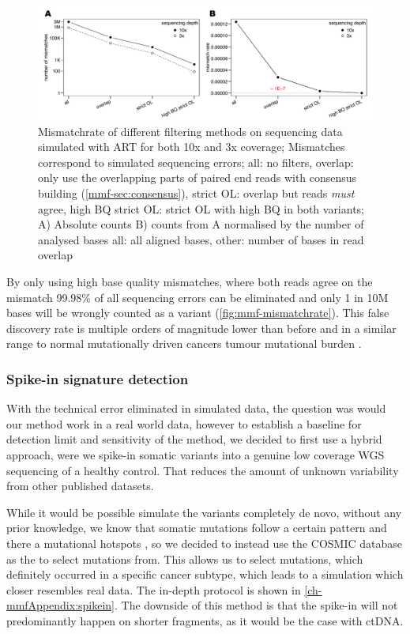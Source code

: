 \begin{figure}[!ht]
\centering
\includegraphics[width=.99\linewidth]{Figures/MisMatchFinder/mismatchrateCleanSequencing.pdf}
\caption[Mismatchrate of different filtering methods]{Mismatchrate of different filtering methods on sequencing data simulated with ART\cite{Huang2011} for both 10x and 3x coverage; Mismatches correspond to simulated sequencing errors; all: no filters, overlap: only use the overlapping parts of paired end reads with consensus building (\protect\autoref{mmf-sec:consensus}), strict OL: overlap but reads \emph{must} agree, high BQ strict OL: strict OL with high BQ in both variants; A) Absolute counts B) counts from A normalised by the number of analysed bases all: all aligned bases, other: number of bases in read overlap}\label{fig:mmf-mismatchrate}
\end{figure}

By only using high base quality mismatches, where both reads agree on the mismatch 99.98\% of all sequencing errors can be eliminated and only 1 in 10M bases will be wrongly counted as a variant (\autoref{fig:mmf-mismatchrate}). This false discovery rate is multiple orders of magnitude lower than before and in a similar range to normal mutationally driven cancers tumour mutational burden \cite{Alexandrov2020,Lawrence2013a}.


\subsubsection{Spike-in signature detection}
\label{mmf-sec:simSingnatures}
With the technical error eliminated in simulated data, the question was would our method work in a real world data, however to establish a baseline for detection limit and sensitivity of the method, we decided to first use a hybrid approach, were we spike-in somatic variants into a genuine low coverage WGS sequencing of a healthy control. That reduces the amount of unknown variability from other published datasets.

While it would be possible simulate the variants completely de novo, without any prior knowledge, we know that somatic mutations follow a certain pattern and there a mutational hotspots \cite{Chen2016,Moore2021}, so we decided to instead use the COSMIC database \cite{Tate2018,WSI2021} as the  to select mutations from. This allows us to select mutations, which definitely occurred in a specific cancer subtype, which leads to a simulation which closer resembles real data. The in-depth protocol is shown in \autoref{ch-mmfAppendix:spikein}. The downside of this method is that the spike-in will not predominantly happen on shorter fragments, as it would be the case with ctDNA. 

